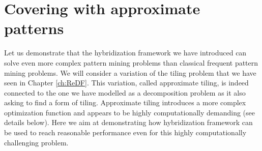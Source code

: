 
\newcommand{\B}{\ensuremath{\{0,1\}}}
\newcommand{\matr}[1]{\ensuremath{\mathbf{#1}}}
\newcommand{\newvec}[1]{\ensuremath{\mathbf{#1}}}
    \newcommand{\nva}{\newvec{a}}
    \newcommand{\nvb}{\newvec{b}}
    \newcommand{\vc}{\newvec{c}}
    \newcommand{\vd}{\newvec{d}}
    \newcommand{\ve}{\newvec{e}}
    \newcommand{\vf}{\newvec{f}}
    \newcommand{\vg}{\newvec{g}}
    \newcommand{\vh}{\newvec{h}}
    \newcommand{\vi}{\newvec{i}}
    \newcommand{\vj}{\newvec{j}}
    \newcommand{\vk}{\newvec{k}}
    \newcommand{\vl}{\newvec{l}}
    \newcommand{\vm}{\newvec{m}}
    \newcommand{\vn}{\newvec{n}}
    \newcommand{\vo}{\newvec{o}}
    \newcommand{\vp}{\newvec{p}}
    \newcommand{\vq}{\newvec{q}}
    \newcommand{\vr}{\newvec{r}}
    \newcommand{\vt}{\newvec{t}}
    \newcommand{\nvu}{\newvec{u}}
    \newcommand{\vv}{\newvec{v}}
    \newcommand{\vw}{\newvec{w}}
    \newcommand{\vx}{\newvec{x}}
    \newcommand{\vy}{\newvec{y}}
    \newcommand{\vz}{\newvec{z}}
    \newcommand{\mA}{\matr{A}}
    \newcommand{\mB}{\matr{B}}
    \newcommand{\mC}{\matr{C}}
    \newcommand{\mD}{\matr{D}}
    \newcommand{\mE}{\matr{E}}
    \newcommand{\mF}{\matr{F}}
    \newcommand{\mG}{\matr{G}}
    \newcommand{\mH}{\matr{H}}
    \newcommand{\mI}{\matr{I}}
    \newcommand{\mJ}{\matr{J}}
    \newcommand{\mK}{\matr{K}}
    \newcommand{\mL}{\matr{L}}
    \newcommand{\mM}{\matr{M}}
    \newcommand{\mN}{\matr{N}}
    \newcommand{\mO}{\matr{O}}
    \newcommand{\mP}{\matr{P}}
    \newcommand{\mQ}{\matr{Q}}
    \newcommand{\mR}{\matr{R}}
    \newcommand{\mS}{\matr{S}}
    \newcommand{\mT}{\matr{T}}
    \newcommand{\mU}{\matr{U}}
    \newcommand{\mV}{\matr{V}}
    \newcommand{\mW}{\matr{W}}
    \newcommand{\mX}{\matr{X}}
    \newcommand{\mY}{\matr{Y}}
    \newcommand{\mZ}{\matr{Z}}


\section{Covering with approximate patterns}\label{sec:tiling}
\pubrev 
Let us demonstrate that the hybridization framework we have introduced can solve even more complex pattern mining problems than classical frequent pattern mining problems. We will consider a variation of the tiling problem that we have seen in Chapter \ref{ch:ReDF}. This variation, called approximate tiling, is indeed connected to the one we have modelled as a decomposition problem as it also asking to find a form of tiling. Approximate tiling introduces a more complex optimization function and appears to be highly computationally demanding (see details below). Here we aim at demonstrating how hybridization framework can be used to reach reasonable performance even for this highly computationally challenging problem.
\pubrevend

